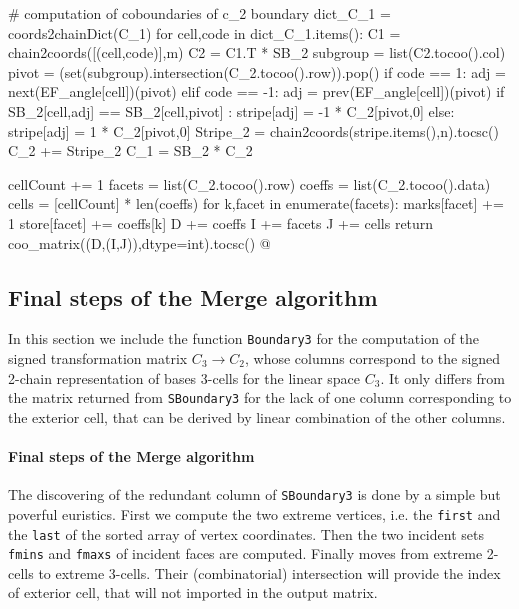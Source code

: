 \documentclass[11pt,oneside]{article}    %
\begin{document}
{			# computation of coboundaries of c_2 boundary
			dict_C_1 = coords2chainDict(C_1)
			for cell,code in dict_C_1.items():
				C1 = chain2coords([(cell,code)],m)
				C2 = C1.T * SB_2
				subgroup = list(C2.tocoo().col)
				pivot = (set(subgroup).intersection(C_2.tocoo().row)).pop()
				if code == 1: 
					adj = next(EF_angle[cell])(pivot)
				elif code == -1:
					adj = prev(EF_angle[cell])(pivot)
				if SB_2[cell,adj] == SB_2[cell,pivot] :
					stripe[adj] = -1 * C_2[pivot,0]
				else:
					stripe[adj] = 1 * C_2[pivot,0]
			Stripe_2 = chain2coords(stripe.items(),n).tocsc()
			C_2 += Stripe_2
			C_1 = SB_2 * C_2
		
		cellCount += 1
		facets = list(C_2.tocoo().row)
		coeffs = list(C_2.tocoo().data)
		cells = [cellCount] * len(coeffs)
		for k,facet in enumerate(facets): 
			marks[facet] += 1
			store[facet] += coeffs[k]
		D += coeffs
		I += facets
		J += cells
	return coo_matrix((D,(I,J)),dtype=int).tocsc()
@}


\subsection{Final steps of the Merge algorithm}

In this section we include the function \texttt{Boundary3} for the computation of the signed transformation matrix $C_3\to C_2$, whose columns correspond to the signed 2-chain representation of bases 3-cells for the linear space $C_3$. It only differs from the matrix returned from \texttt{SBoundary3} for the lack of one column corresponding to the exterior cell, that can be derived by linear combination of the other columns.

\paragraph{Final steps of the Merge algorithm}
The discovering of the redundant column of \texttt{SBoundary3} is done by a simple but poverful euristics. First we compute the two extreme vertices, i.e. the \texttt{first} and the \texttt{last} of the sorted array of vertex coordinates. Then the two incident sets \texttt{fmins} and \texttt{fmaxs} of incident faces are computed. Finally moves from extreme 2-cells to extreme 3-cells. Their (combinatorial) intersection will provide the index of exterior cell, that will not imported in the output matrix.
\end{document}
